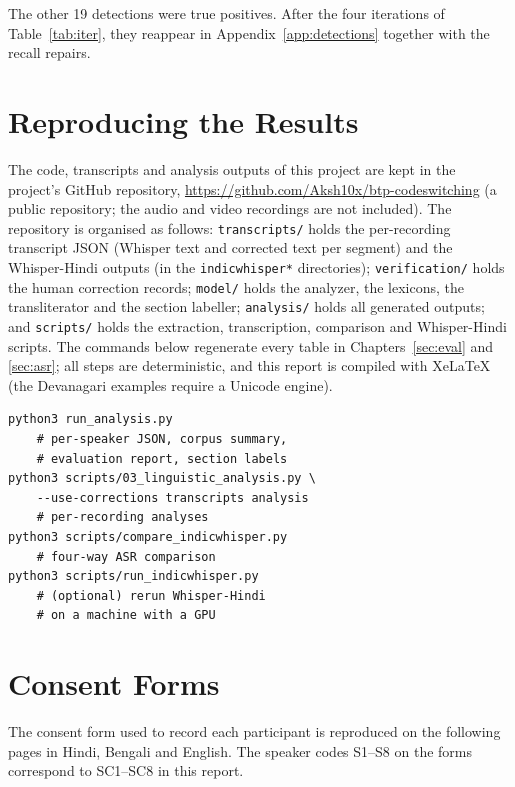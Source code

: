 \documentclass[11pt,a4paper]{report}
\begin{document}
The other 19 detections were true positives. After the four iterations of Table~\ref{tab:iter}, they reappear in Appendix~\ref{app:detections} together with the recall repairs.

\chapter{Reproducing the Results}
\label{app:repro}

The code, transcripts and analysis outputs of this project are kept in the project's GitHub repository, \url{https://github.com/Aksh10x/btp-codeswitching} (a public repository; the audio and video recordings are not included). The repository is organised as follows: \texttt{transcripts/} holds the per-recording transcript JSON (Whisper text and corrected text per segment) and the Whisper-Hindi outputs (in the \texttt{indicwhisper*} directories); \texttt{verification/} holds the human correction records; \texttt{model/} holds the analyzer, the lexicons, the transliterator and the section labeller; \texttt{analysis/} holds all generated outputs; and \texttt{scripts/} holds the extraction, transcription, comparison and Whisper-Hindi scripts. The commands below regenerate every table in Chapters~\ref{sec:eval} and \ref{sec:asr}; all steps are deterministic, and this report is compiled with XeLaTeX (the Devanagari examples require a Unicode engine).

\begin{verbatim}
python3 run_analysis.py
    # per-speaker JSON, corpus summary,
    # evaluation report, section labels
python3 scripts/03_linguistic_analysis.py \
    --use-corrections transcripts analysis
    # per-recording analyses
python3 scripts/compare_indicwhisper.py
    # four-way ASR comparison
python3 scripts/run_indicwhisper.py
    # (optional) rerun Whisper-Hindi
    # on a machine with a GPU
\end{verbatim}

\chapter{Consent Forms}
\label{app:consent}

The consent form used to record each participant is reproduced on the following pages in Hindi, Bengali and English. The speaker codes S1--S8 on the forms correspond to SC1--SC8 in this report.


\end{document}
